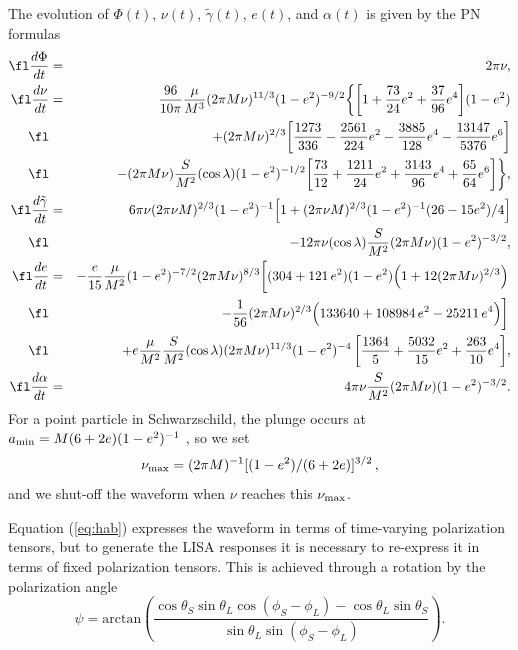\documentclass{iopart}
\def\be{\begin{equation}}
\def\ee{\end{equation}}
\begin{document}
The evolution of $\Phi(t)$, $\nu(t)$, $\tilde\gamma(t)$, $e(t)$, and $\alpha(t)$ is given by the PN formulas
\begin{eqnarray}
\fl \frac{d\Phi}{dt} &=& 2\pi\nu, \label{Phidot} \\
\fl \frac{d\nu}{dt} &=&
\frac{96}{10\pi}\frac{\mu}{M^3}(2\pi M\nu)^{11/3}(1-e^2)^{-9/2}
\biggl\{
\biggl[1+\frac{73}{24}e^2+\frac{37}{96}e^4\biggr](1-e^2) \nonumber \\
\fl &&+ (2\pi M\nu)^{2/3}\biggl[\frac{1273}{336}-\frac{2561}{224}e^2-\frac{3885}{128}e^4
-\frac{13147}{5376}e^6 \biggr] \nonumber \\
\fl &&- (2\pi M\nu)\frac{S}{M^2}(\cos\lambda) (1-e^2)^{-1/2}\biggl[\frac{73}{12}
+ \frac{1211}{24}e^2 +\frac{3143}{96}e^4 +\frac{65}{64}e^6\biggr]
\biggr\}, \label{nudot} \\
\fl \frac{d\tilde\gamma}{dt} &=& 6\pi\nu(2\pi\nu M)^{2/3} (1-e^2)^{-1}
\Bigl[1+(2\pi\nu M)^{2/3} (1-e^2)^{-1}(26-15e^2)/4\Bigr] \nonumber \\
\fl &&-12\pi\nu(\cos\lambda) \frac{S}{M^2} (2\pi M\nu)(1-e^2)^{-3/2},
\label{Gamdot} \\
\fl \frac{de}{dt}  &=& -\frac{e}{15}\frac{\mu}{M^2} (1-e^2)^{-7/2} (2\pi M\nu)^{8/3}
\biggl[(304+121\,e^2)(1-e^2)\Bigl(1 + 12 (2\pi M\nu)^{2/3}\Bigr) \, \nonumber \\
\fl &&- \frac{1}{56}(2\pi M\nu)^{2/3}\Bigl( 133640 + 108984\, e^2 - 25211\, e^4 \Bigr)\biggr]\, \nonumber \\
\fl && + e \frac{\mu}{M^2}\frac{S}{M^2}(\cos\lambda)(2\pi M\nu)^{11/3}(1-e^2)^{-4}
\, \biggl[\frac{1364}{5} + \frac{5032}{15}e^2  + \frac{263}{10}e^4\biggr], \label{edot} \\
\fl \frac{d\alpha}{dt} &=& 4\pi\nu \frac{S}{M^2} (2\pi M\nu)(1-e^2)^{-3/2}.
\label{alphadot}
\end{eqnarray}
%
For a point particle in Schwarzschild, the plunge occurs at
$a_{\rm min} = M (6 + 2e)(1-e^2)^{-1}$ \cite{ckp},
so we set
\be\label{numax}
\nu_{\rm max} = (2\pi M)^{-1}[(1-e^2)/(6 + 2e)]^{3/2} \, ,
\ee
and we shut-off the waveform when $\nu$ reaches this $\nu_{\rm max}$.

Equation (\ref{eq:hab}) expresses the waveform in terms of time-varying polarization tensors, but to generate the LISA responses it is necessary to re-express it in terms of fixed polarization tensors. This is achieved through a rotation by the polarization angle
\begin{equation}\label{psiSL}
\psi = \mathrm{arctan}\left(\frac{
\cos \theta_S \sin \theta_L \cos(\phi_S - \phi_L) - \cos\theta_L \sin\theta_S
}{
\sin\theta_L \sin(\phi_S-\phi_L)
}\right).
\end{equation}
\end{document}
